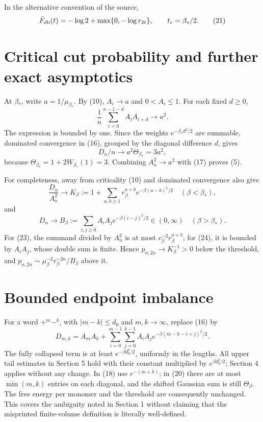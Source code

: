 \documentclass[11pt,a4paper]{report}
\begin{document}
In the alternative convention of the source,
\[\bar F_{\rm db}(t)=-\log2+\max\{0,-\log r_{2t}\},\qquad t_c=\beta_*/2.
 \tag{21}\]

\section{Critical cut probability and further exact asymptotics}

At \(\beta_*\), write \(a=1/\mu_{\beta_*}\). By (10), \(A_i\to a\) and \(0<A_i\leq1\). For each fixed \(d\geq0\),
\[\frac1n\sum_{i=0}^{n-1-d}A_i A_{i+d}\longrightarrow a^2.\]
The expression is bounded by one. Since the weights \(e^{-\beta_*d^2/2}\) are summable, dominated convergence in (16), grouped by the diagonal difference \(d\), gives
\[D_n/n\longrightarrow a^2\Theta_{\beta_*}=3a^2,
 \tag{22}\]
because \(\Theta_{\beta_*}=1+2W_{\beta_*}(1)=3\). Combining \(A_n^2\to a^2\) with (17) proves (5).

For completeness, away from criticality (10) and dominated convergence also give
\[\frac{D_n}{A_n^2}\longrightarrow
 K_\beta:=1+\sum_{a,b\geq1}r_\beta^{a+b}e^{-\beta(a-b)^2/2}
 \quad(\beta<\beta_*),
 \tag{23}\]
and
\[D_n\longrightarrow B_\beta:=\sum_{i,j\geq0}A_iA_j e^{-\beta(i-j)^2/2}\in(0,\infty)
 \quad(\beta>\beta_*).
 \tag{24}\]
For (23), the summand divided by \(A_n^2\) is at most \(c_\beta^{-2}r_\beta^{a+b}\); for (24), it is bounded by \(A_iA_j\), whose double sum is finite. Hence
\(p_{n,2n}\to K_\beta^{-1}>0\) below the threshold, and
\(p_{n,2n}\sim\mu_\beta^{-2}r_\beta^{-2n}/B_\beta\) above it.

\section{Bounded endpoint imbalance}

For a word \(+^m-^k\), with \(|m-k|\leq d_0\) and \(m,k\to\infty\), replace (16) by
\[D_{m,k}=A_mA_k+\sum_{i=0}^{m-1}\sum_{j=0}^{k-1}
 A_iA_j e^{-\beta(m-k-i+j)^2/2}.
 \tag{25}\]
The fully collapsed term is at least \(e^{-\beta d_0^2/2}\), uniformly in the lengths. All upper tail estimates in Section 5 hold with their constant multiplied by \(e^{\beta d_0^2/2}\); Section 4 applies without any change. In (18) use \(r^{-(m+k)}\); in (20) there are at most \(\min(m,k)\) entries on each diagonal, and the shifted Gaussian sum is still \(\Theta_\beta\). The free energy per monomer and the threshold are consequently unchanged. This covers the ambiguity noted in Section 1 without claiming that the misprinted finite-volume definition is literally well-defined.
\end{document}
